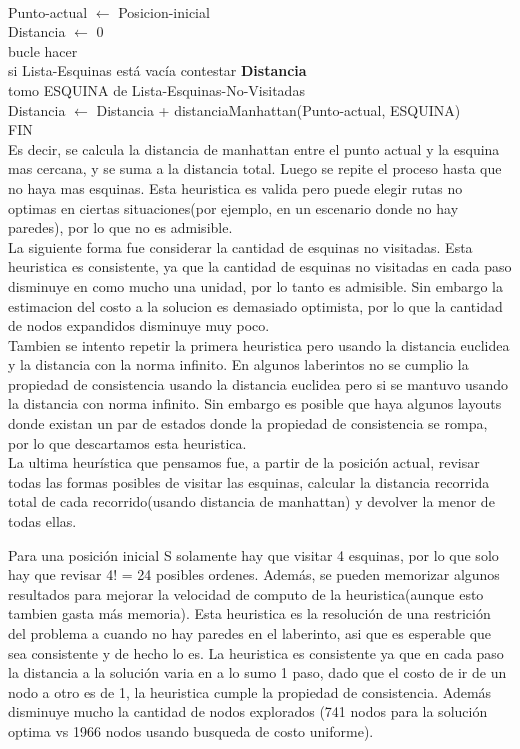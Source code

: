 \documentclass[12pt, titlepage, a4paper]{article}
\begin{document}
\ 

\noindent Punto-actual $\leftarrow$ Posicion-inicial\\
\noindent  Distancia $\leftarrow$ 0\\

\noindent bucle hacer\\
\indent si Lista-Esquinas está vacía contestar \textbf{Distancia}\\
\indent tomo ESQUINA de Lista-Esquinas-No-Visitadas\\
\indent Distancia $\leftarrow$ Distancia + distanciaManhattan(Punto-actual, ESQUINA)\\
\noindent FIN\\

Es decir, se calcula la distancia de manhattan entre el punto actual y la esquina
mas cercana, y se suma a la distancia total. Luego se repite el proceso hasta que no haya mas esquinas.
Esta heuristica es valida pero puede elegir rutas no optimas en ciertas situaciones(por ejemplo, en un escenario
donde no hay paredes), por lo que no es admisible.\\

La siguiente forma fue considerar la cantidad de esquinas no visitadas. Esta heuristica es consistente, ya que
la cantidad de esquinas no visitadas en cada paso disminuye en como mucho una unidad, por lo tanto es admisible.
Sin embargo la estimacion del costo a la solucion es demasiado optimista, por lo que la cantidad de nodos expandidos
disminuye muy poco.\\

Tambien se intento repetir la primera heuristica pero usando la distancia euclidea y la distancia con la norma
infinito. En algunos laberintos no se cumplio la propiedad de consistencia usando la distancia euclidea pero si
se mantuvo usando la distancia con norma infinito. Sin embargo es posible que haya algunos layouts donde existan
un par de estados donde la propiedad de consistencia se rompa, por lo que descartamos esta heuristica.\\

La ultima heurística que pensamos fue, a partir de la posición actual, revisar todas las formas posibles
de visitar las esquinas, calcular la distancia recorrida total de cada recorrido(usando distancia de manhattan) y devolver la menor de todas
ellas.

Para una posición inicial S solamente hay que visitar 4 esquinas, por lo que solo hay que revisar 4! = 24 posibles
ordenes. Además, se pueden memorizar algunos resultados para mejorar la velocidad de computo de la heuristica(aunque
esto tambien gasta más memoria). Esta heuristica es la resolución de una restrición del problema a cuando no hay
paredes en el laberinto, asi que es esperable que sea consistente y de hecho lo es. La heuristica es consistente ya que en cada paso la 
distancia a la solución varia en a lo sumo 1 paso, dado que el costo de ir de un nodo a otro es de 1, la heuristica cumple la propiedad de
consistencia. Además disminuye mucho la cantidad de nodos explorados (741 nodos para la solución optima vs 1966 nodos
usando busqueda de costo uniforme).
\end{document}
